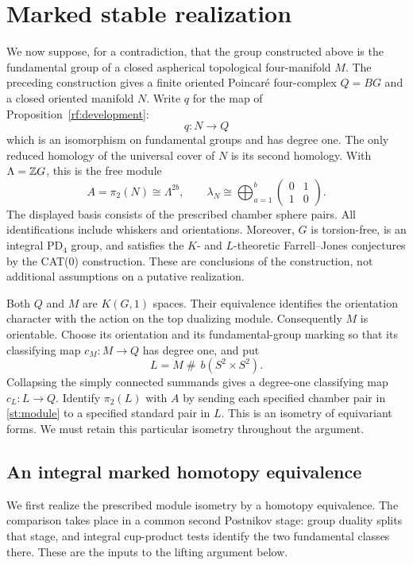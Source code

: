\section{Marked stable realization}\label{st:setup}

We now suppose, for a contradiction, that the group constructed above is
the fundamental group of a closed aspherical topological four-manifold
$M$.  The preceding construction gives a finite oriented Poincar\'e
four-complex $Q=BG$ and a closed oriented manifold $N$.  Write $q$ for
the map of Proposition~\ref{rf:development}:
\[
 q\colon N\longrightarrow Q
\]
which is an isomorphism on fundamental groups and has degree one.  The
only reduced homology of the universal cover of $N$ is its second
homology.  With $\Lambda=\mathbb Z G$, this is the free module
\begin{equation}\label{st:module}
 A=\pi_2(N)\cong\Lambda^{2b},
 \qquad \lambda_N\cong\bigoplus_{a=1}^{b}
 \begin{pmatrix}0&1\\1&0\end{pmatrix}.
\end{equation}
The displayed basis consists of the prescribed chamber sphere pairs.
All identifications include whiskers and orientations.  Moreover, $G$
is torsion-free, is an integral $\mathrm{PD}_4$ group, and satisfies the
$K$- and $L$-theoretic Farrell--Jones conjectures by the CAT(0)
construction.  These are conclusions of the construction, not
additional assumptions on a putative realization.

Both $Q$ and $M$ are $K(G,1)$ spaces.  Their equivalence identifies the
orientation character with the action on the top dualizing module.
Consequently $M$ is orientable.  Choose its orientation and its
fundamental-group marking so that its classifying map
$c_M\colon M\to Q$ has degree one, and put
\[
 L=M\mathbin{\#}\,b(S^2\times S^2).
\]
Collapsing the simply connected summands gives a degree-one classifying
map $c_L\colon L\to Q$.  Identify $\pi_2(L)$ with $A$ by sending each
specified chamber pair in \eqref{st:module} to a specified standard pair
in $L$.  This is an isometry of equivariant forms.  We must retain this
particular isometry throughout the argument.

\subsection{An integral marked homotopy equivalence}

We first realize the prescribed module isometry by a homotopy
equivalence. The comparison takes place in a common second Postnikov
stage: group duality splits that stage, and integral cup-product tests
identify the two fundamental classes there. These are the inputs to
the lifting argument below.

